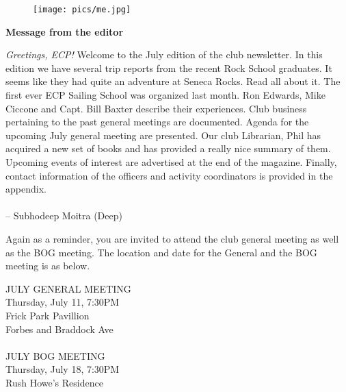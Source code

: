 \documentclass[10pt,a4paper]{article}
\newcommand{\NewsItem}[1]{%
		\usefont{T1}{augie}{m}{n} 	
		\large \bf #1 \vspace{4pt}
		\par \normalsize \normalfont}
\begin{document}
\begin{center}
\begin{minipage}[h]{0.8\linewidth}
	\begin{wrapfigure}{l}{0.41\textwidth}
		\texttt{[image: pics/me.jpg]}
		\\%
	\end{wrapfigure}
	
	\NewsItem{Message from the editor}

	\emph{Greetings, ECP!} Welcome to the July edition of the club newsletter. In this edition we have several trip reports from the recent Rock School graduates. It seems like they had quite an adventure at Seneca Rocks. Read all about it. The first ever ECP Sailing School was organized last month. Ron Edwards, Mike Ciccone and Capt. Bill Baxter describe their experiences. Club business pertaining to the past general meetings are documented. Agenda for the upcoming July general meeting are presented. Our club Librarian, Phil has acquired a new set of books and has provided a really nice summary of them. Upcoming events of interest are advertised at the end of the magazine. Finally, contact information of the officers and activity coordinators is provided in the appendix. 
\\
\\
-- Subhodeep Moitra (Deep)

\vspace{0.5cm}



	Again as a reminder, you are invited to attend the club general meeting as well as the BOG meeting. The location and date for the General and the BOG meeting is as below.
	
\vspace{1cm}

\begin{multicols}{2}
\Large


JULY GENERAL MEETING\\
Thursday, July 11, 7:30PM\\
Frick Park Pavillion\\
Forbes and Braddock Ave\\
\\
JULY BOG MEETING\\
Thursday, July 18, 7:30PM\\
Rush Howe's Residence \\ 


\normalsize
\end{multicols}
	
\end{minipage}
\end{center}
\end{document}
